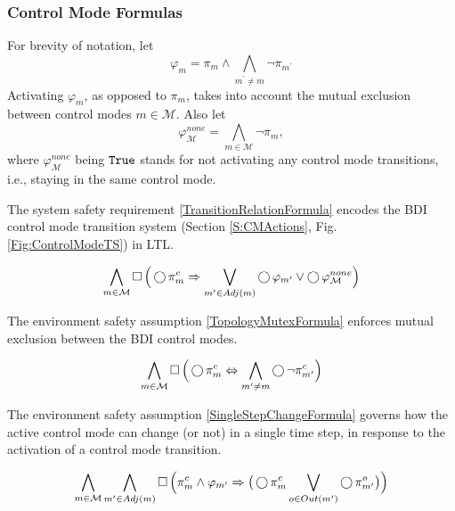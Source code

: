 \subsubsection{Control Mode Formulas}

For brevity of notation, let $$\varphi_m = \pi_m \wedge \bigwedge_{m^\prime \neq m} \lnot \pi_{m^\prime}$$
Activating $\varphi_m$, as opposed to $\pi_m$, takes into account the mutual exclusion between control modes $m \in \mathcal{M}$.
Also let $$\varphi_\mathcal{M}^{none} = \bigwedge_{m \in \mathcal{M}} \lnot \pi_m,$$
where $\varphi_\mathcal{M}^{none}$ being $\mathtt{True}$ stands for not activating any control mode transitions, i.e., staying in the same control mode.

The system safety requirement \eqref{TransitionRelationFormula} encodes the BDI control mode transition system (Section \ref{S:CMActions}, Fig. \ref{Fig:ControlModeTS}) in LTL.

\begin{equation}\label{TransitionRelationFormula}
	\bigwedge \limits_{m \in \mathcal{M}} \operatorname{\Box} \Big( \operatorname{\bigcirc} \pi_m^c \Rightarrow \bigvee \limits_{m^\prime \in Adj(m)} \operatorname{\bigcirc} \varphi_{m^\prime} \vee \operatorname{\bigcirc} \varphi_\mathcal{M}^{none} \Big)
\end{equation}

The environment safety assumption \eqref{TopologyMutexFormula} enforces mutual exclusion between the BDI control modes.

\begin{equation}\label{TopologyMutexFormula}
	\bigwedge \limits_{m \in \mathcal{M}} \operatorname{\Box} \Big( \operatorname{\bigcirc} \pi_m^c \Leftrightarrow \bigwedge \limits_{m^\prime \neq m} \operatorname{\bigcirc} \lnot \pi_{m^\prime}^c \Big)
\end{equation}

The environment safety assumption \eqref{SingleStepChangeFormula} governs how the active control mode can change (or not) in a single time step, in response to the activation of a control mode transition.

\begin{equation}\label{SingleStepChangeFormula}
	\bigwedge \limits_{m \in \mathcal{M}} \bigwedge \limits_{m^\prime \in Adj(m)} \operatorname{\Box} \Big( \pi_m^c \wedge  \varphi_{m^\prime} \Rightarrow \big( \operatorname{\bigcirc} \pi_{m}^c \bigvee \limits_{o \in Out(m^\prime)} \operatorname{\bigcirc} \pi_{m^\prime}^o \big) \Big)
\end{equation}

